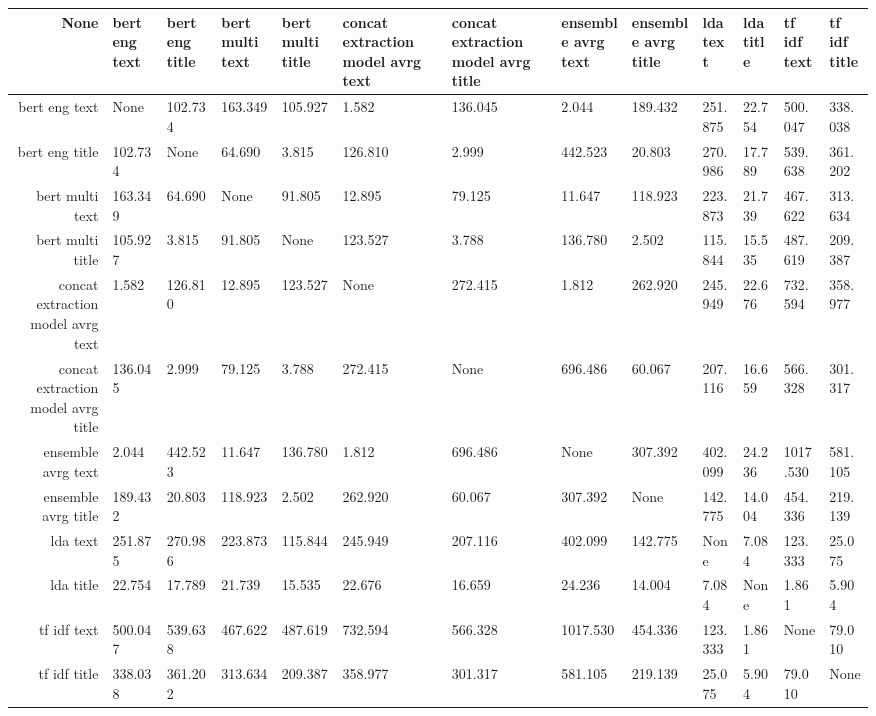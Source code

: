 \begin{tabular}{|r|l|l|l|l|l|l|l|l|l|l|l|l|}
  \hline
  None & bert eng text & bert eng title & bert multi text & bert multi title & concat extraction model avrg text & concat extraction model avrg title & ensemble avrg text & ensemble avrg title & lda text & lda title & tf idf text & tf idf title \\ 
  \hline
  bert eng text & None & 102.734 & 163.349 & 105.927 & 1.582 & 136.045 & 2.044 & 189.432 & 251.875 & 22.754 & 500.047 & 338.038 \\ 
  \hline
  bert eng title & 102.734 & None & 64.690 & 3.815 & 126.810 & 2.999 & 442.523 & 20.803 & 270.986 & 17.789 & 539.638 & 361.202 \\ 
  \hline
  bert multi text & 163.349 & 64.690 & None & 91.805 & 12.895 & 79.125 & 11.647 & 118.923 & 223.873 & 21.739 & 467.622 & 313.634 \\ 
  \hline
  bert multi title & 105.927 & 3.815 & 91.805 & None & 123.527 & 3.788 & 136.780 & 2.502 & 115.844 & 15.535 & 487.619 & 209.387 \\ 
  \hline
  concat extraction model avrg text & 1.582 & 126.810 & 12.895 & 123.527 & None & 272.415 & 1.812 & 262.920 & 245.949 & 22.676 & 732.594 & 358.977 \\ 
  \hline
  concat extraction model avrg title & 136.045 & 2.999 & 79.125 & 3.788 & 272.415 & None & 696.486 & 60.067 & 207.116 & 16.659 & 566.328 & 301.317 \\ 
  \hline
  ensemble avrg text & 2.044 & 442.523 & 11.647 & 136.780 & 1.812 & 696.486 & None & 307.392 & 402.099 & 24.236 & 1017.530 & 581.105 \\ 
  \hline
  ensemble avrg title & 189.432 & 20.803 & 118.923 & 2.502 & 262.920 & 60.067 & 307.392 & None & 142.775 & 14.004 & 454.336 & 219.139 \\ 
  \hline
  lda text & 251.875 & 270.986 & 223.873 & 115.844 & 245.949 & 207.116 & 402.099 & 142.775 & None & 7.084 & 123.333 & 25.075 \\ 
  \hline
  lda title & 22.754 & 17.789 & 21.739 & 15.535 & 22.676 & 16.659 & 24.236 & 14.004 & 7.084 & None & 1.861 & 5.904 \\ 
  \hline
  tf idf text & 500.047 & 539.638 & 467.622 & 487.619 & 732.594 & 566.328 & 1017.530 & 454.336 & 123.333 & 1.861 & None & 79.010 \\ 
  \hline
  tf idf title & 338.038 & 361.202 & 313.634 & 209.387 & 358.977 & 301.317 & 581.105 & 219.139 & 25.075 & 5.904 & 79.010 & None \\ 
  \hline
\end{tabular}
